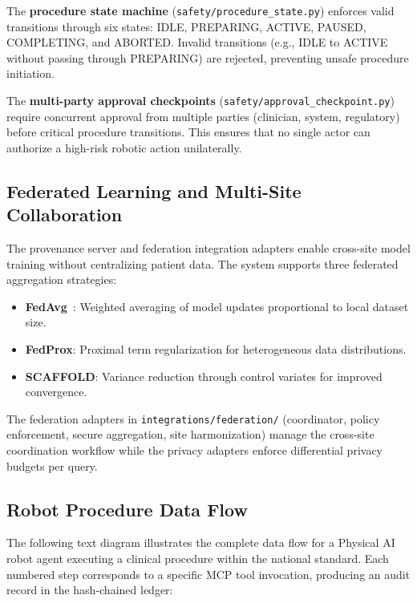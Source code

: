 The \textbf{procedure state machine} (\texttt{safety/procedure\_state.py}) enforces valid transitions through six states: IDLE, PREPARING, ACTIVE, PAUSED, COMPLETING, and ABORTED. Invalid transitions (e.g., IDLE to ACTIVE without passing through PREPARING) are rejected, preventing unsafe procedure initiation.

The \textbf{multi-party approval checkpoints} (\texttt{safety/approval\_checkpoint.py}) require concurrent approval from multiple parties (clinician, system, regulatory) before critical procedure transitions. This ensures that no single actor can authorize a high-risk robotic action unilaterally.

\subsection{Federated Learning and Multi-Site Collaboration}

The provenance server and federation integration adapters enable cross-site model training without centralizing patient data. The system supports three federated aggregation strategies:

\begin{itemize}[leftmargin=*]
\item \textbf{FedAvg}~\cite{mcmahan2017fedavg}: Weighted averaging of model updates proportional to local dataset size.
\item \textbf{FedProx}: Proximal term regularization for heterogeneous data distributions.
\item \textbf{SCAFFOLD}: Variance reduction through control variates for improved convergence.
\end{itemize}

The federation adapters in \texttt{integrations/federation/} (coordinator, policy enforcement, secure aggregation, site harmonization) manage the cross-site coordination workflow while the privacy adapters enforce differential privacy budgets per query.

\subsection{Robot Procedure Data Flow}

The following text diagram illustrates the complete data flow for a Physical AI robot agent executing a clinical procedure within the national standard. Each numbered step corresponds to a specific MCP tool invocation, producing an audit record in the hash-chained ledger:

